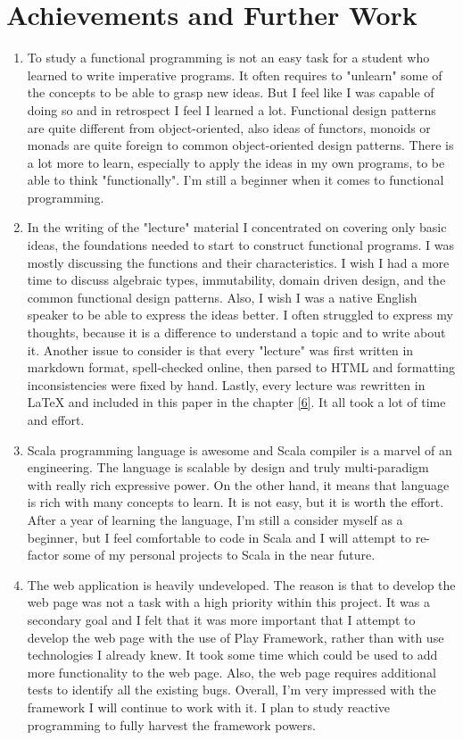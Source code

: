 \documentclass[12pt,twoside,a4paper]{report}
\begin{document}
\section{Achievements and Further Work}\label{7.2}
\begin{enumerate}\itemsep1pt \parskip0pt 
\item To study a functional programming is not an easy task for a student who learned to write imperative programs. It often requires to "unlearn" some of the concepts to be able to grasp new ideas. But I feel like I was capable of doing so and in retrospect I feel I learned a lot. Functional design patterns are quite different from object-oriented, also ideas of functors, monoids or monads are quite foreign to common object-oriented design patterns. There is a lot more to learn, especially to apply the ideas in my own programs, to be able to think "functionally". I'm still a beginner when it comes to functional programming.
\item In the writing of the "lecture" material I concentrated on covering only basic ideas, the foundations needed to start to construct functional programs. I was mostly discussing the functions and their characteristics. I wish I had a more time to discuss algebraic types, immutability, domain driven design, and the common functional design patterns. Also, I wish I was a native English speaker to be able to express the ideas better. I often struggled to express my thoughts, because it is a difference to understand a topic and to write about it. Another issue to consider is that every "lecture" was first written in markdown format, spell-checked online, then parsed to HTML and formatting inconsistencies were fixed by hand. Lastly, every lecture was rewritten in LaTeX and included in this paper in the chapter \ref{6}. It all took a lot of time and effort.
\item Scala programming language is awesome and Scala compiler is a marvel of an engineering. The language is scalable by design and truly multi-paradigm with really rich expressive power. On the other hand, it means that language is rich with many concepts to learn. It is not easy, but it is worth the effort. After a year of learning the language, I'm still a consider myself as a beginner, but I feel comfortable to code in Scala and I will attempt to re-factor some of my personal projects to Scala in the near future.
\item The web application is heavily undeveloped. The reason is that to develop the web page was not a task with a high priority within this project. It was a secondary goal and I felt that it was more important that I attempt to develop the web page with the use of Play Framework, rather than with use technologies I already knew. It took some time which could be used to add more functionality to the web page. Also, the web page requires additional tests to identify all the existing bugs. Overall, I'm very impressed with the framework I will continue to work with it. I plan to study reactive programming to fully harvest the framework powers.
\end{enumerate}
\end{document}
